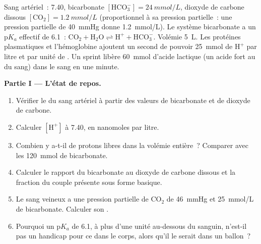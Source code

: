 \begin{problem}
\label{pb:b1:water-small-molecules:1}
Sang artériel~:  7.40, bicarbonate $[\mathrm{HCO_3^-}] =
\qty{24}{mmol/L}$, dioxyde de carbone dissous $[\mathrm{CO_2}] =
\qty{1.2}{mmol/L}$ (proportionnel à sa pression partielle~: une pression
partielle de \qty{40}{mmHg} donne \qty{1.2}{mmol/L}). Le système
bicarbonate a un p$K_a$ effectif de 6.1~: $\mathrm{CO_2} + \mathrm{H_2O}
\rightleftharpoons \mathrm{H^+} + \mathrm{HCO_3^-}$. Volémie
\qty{5}{L}. Les protéines plasmatiques et l'hémoglobine ajoutent un
second  de pouvoir \qty{25}{mmol} de $\mathrm{H^+}$ par litre et
par unité de . Un sprint libère \qty{60}{mmol} d'acide lactique (un
acide fort au  du sang) dans le sang en une minute.

\medskip
\noindent\textbf{Partie I --- L'état de repos.}
\begin{enumerate}
  \item Vérifier le  du sang artériel à partir des valeurs de
        bicarbonate et de dioxyde de carbone.
  \item Calculer $[\mathrm{H^+}]$ à  7.40, en nanomoles par litre.
  \item Combien y a-t-il de protons libres dans la volémie entière~?
        Comparer avec les \qty{120}{mmol} de bicarbonate.
  \item Calculer le rapport du bicarbonate au dioxyde de carbone dissous
        et la fraction du couple  présente sous forme basique.
  \item Le sang veineux a une pression partielle de $\mathrm{CO_2}$ de
        \qty{46}{mmHg} et \qty{25}{mmol/L} de bicarbonate. Calculer son
        .
  \item Pourquoi un p$K_a$ de 6.1, à plus d'une unité au-dessous du 
        sanguin, n'est-il pas un handicap pour ce  dans le corps,
        alors qu'il le serait dans un ballon~?
\end{enumerate}


\end{problem}
